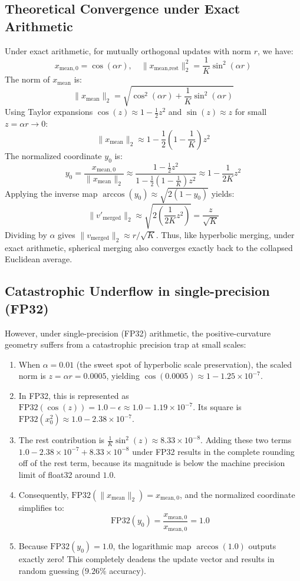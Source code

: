 \documentclass{article}
\theoremstyle{plain}
\theoremstyle{definition}
\theoremstyle{remark}
\begin{document}
\subsection{Theoretical Convergence under Exact Arithmetic}
Under exact arithmetic, for mutually orthogonal updates with norm $r$, we have:
$$x_{\text{mean}, 0} = \cos(\alpha r), \quad \|x_{\text{mean}, \text{rest}}\|_2^2 = \frac{1}{K} \sin^2(\alpha r)$$
The norm of $x_{\text{mean}}$ is:
$$\|x_{\text{mean}}\|_2 = \sqrt{\cos^2(\alpha r) + \frac{1}{K} \sin^2(\alpha r)}$$
Using Taylor expansions $\cos(z) \approx 1 - \frac{1}{2} z^2$ and $\sin(z) \approx z$ for small $z = \alpha r \to 0$:
$$\|x_{\text{mean}}\|_2 \approx 1 - \frac{1}{2}\left(1 - \frac{1}{K}\right) z^2$$
The normalized coordinate $y_0$ is:
$$y_0 = \frac{x_{\text{mean}, 0}}{\|x_{\text{mean}}\|_2} \approx \frac{1 - \frac{1}{2} z^2}{1 - \frac{1}{2}\left(1 - \frac{1}{K}\right) z^2} \approx 1 - \frac{1}{2K} z^2$$
Applying the inverse map $\arccos(y_0) \approx \sqrt{2(1 - y_0)}$ yields:
$$\|v'_{\text{merged}}\|_2 \approx \sqrt{2 \left(\frac{1}{2K} z^2\right)} = \frac{z}{\sqrt{K}}$$
Dividing by $\alpha$ gives $\|v_{\text{merged}}\|_2 \approx r/\sqrt{K}$. Thus, like hyperbolic merging, under exact arithmetic, spherical merging also converges exactly back to the collapsed Euclidean average.

\subsection{Catastrophic Underflow in single-precision (FP32)}
However, under single-precision (FP32) arithmetic, the positive-curvature geometry suffers from a catastrophic precision trap at small scales:
\begin{enumerate}
    \item When $\alpha = 0.01$ (the sweet spot of hyperbolic scale preservation), the scaled norm is $z = \alpha r = 0.0005$, yielding $\cos(0.0005) \approx 1 - 1.25 \times 10^{-7}$.
    \item In FP32, this is represented as $\text{FP32}(\cos(z)) = 1.0 - \epsilon \approx 1.0 - 1.19 \times 10^{-7}$. Its square is $\text{FP32}(x_0^2) \approx 1.0 - 2.38 \times 10^{-7}$.
    \item The rest contribution is $\frac{1}{K} \sin^2(z) \approx 8.33 \times 10^{-8}$. Adding these two terms $1.0 - 2.38 \times 10^{-7} + 8.33 \times 10^{-8}$ under FP32 results in the complete rounding off of the rest term, because its magnitude is below the machine precision limit of float32 around $1.0$.
    \item Consequently, $\text{FP32}(\|x_{\text{mean}}\|_2) = x_{\text{mean}, 0}$, and the normalized coordinate simplifies to:
    $$\text{FP32}(y_0) = \frac{x_{\text{mean}, 0}}{x_{\text{mean}, 0}} = 1.0$$
    \item Because $\text{FP32}(y_0) = 1.0$, the logarithmic map $\arccos(1.0)$ outputs exactly zero! This completely deadens the update vector and results in random guessing ($9.26\%$ accuracy).
\end{enumerate}
\end{document}
